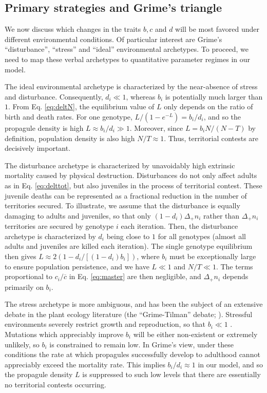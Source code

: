 \documentclass[11pt]{article}
\begin{document}
\subsection*{Primary strategies and Grime's triangle}

We now discuss which changes in the traits $b, c$ and $d$ will be most favored under different environmental conditions. Of particular interest are Grime's ``disturbance'', ``stress'' and ``ideal'' environmental archetypes. To proceed, we need to map these verbal archetypes to quantitative parameter regimes in our model. 

The ideal environmental archetype is characterized by the near-absence of stress and disturbance. Consequently, $d_i\ll 1$, whereas $b_i$ is potentially much larger than $1$. From Eq. \eqref{eq:deltN}, the equilibrium value of $L$ only depends on the ratio of birth and death rates. For one genotype, $L/(1-e^{-L})=b_i/d_i$, and so the propagule density is high $L\approx b_i/d_i\gg 1$. Moreover, since $L=b_i N/(N-T)$ by definition, population density is also high $N/T\approx 1$. Thus, territorial contests are decisively important.

The disturbance archetype is characterized by unavoidably high extrinsic mortality caused by physical destruction. Disturbances do not only affect adults as in Eq. \eqref{eq:delttot}, but also juveniles in the process of territorial contest. These juvenile deaths can be represented as a fractional reduction in the number of territories secured. To illustrate, we assume that the disturbance is equally damaging to adults and juveniles, so that only $(1-d_i)\Delta_+ n_i$ rather than $\Delta_+ n_i$ territories are secured by genotype $i$ each iteration. Then, the disturbance archetype is characterized by $d_i$ being close to $1$ for all genotypes (almost all adults and juveniles are killed each iteration). The single genotype equilibrium then gives $L\approx 2(1-d_i/[(1-d_i)b_i])$, where $b_i$ must be exceptionally large to ensure population persistence, and we have $L\ll 1$ and $N/T\ll 1$. The terms proportional to $c_i/\overline{c}$ in Eq. \eqref{eq:master} are then negligible, and $\Delta_+ n_i$ depends primarily on $b_i$. 

The stress archetype is more ambiguous, and has been the subject of an extensive debate in the plant ecology literature (the ``Grime-Tilman'' debate; \citealt{aerts_1999}). Stressful environments severely restrict growth and reproduction, so that $b_i\ll 1$ \cite{grime_1974,grime_1977}. Mutations which appreciably improve $b_i$ will be either non-existent or extremely unlikely, so $b_i$ is constrained to remain low. In Grime's view, under these conditions the rate at which propagules successfully develop to adulthood cannot appreciably exceed the mortality rate. This implies $b_i/d_i\approx 1$ in our model, and so the propagule density $L$ is suppressed to such low levels that there are essentially no territorial contests occurring. 
\end{document}
